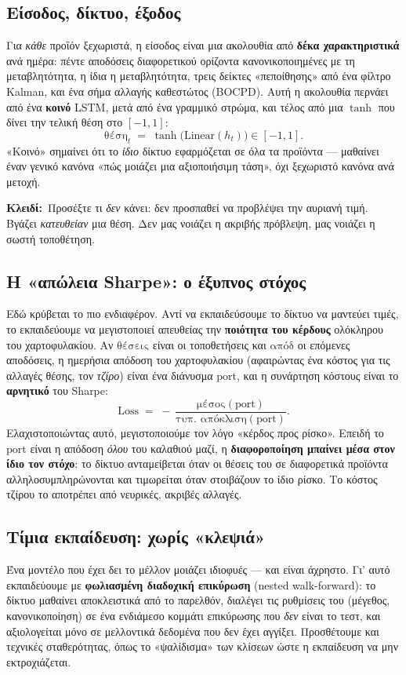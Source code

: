 \documentclass[11pt]{article}
\newcommand{\key}[1]{\par\medskip\noindent\colorbox{soft}{\parbox{\dimexpr\linewidth-2\fboxsep}{\textcolor{accent}{\textbf{Κλειδί:}}\ #1}}\par\medskip}
\begin{document}
\subsection{Είσοδος, δίκτυο, έξοδος}
Για \emph{κάθε} προϊόν ξεχωριστά, η είσοδος είναι μια ακολουθία από \textbf{δέκα χαρακτηριστικά} ανά
ημέρα: πέντε αποδόσεις διαφορετικού ορίζοντα κανονικοποιημένες με τη μεταβλητότητα, η ίδια η
μεταβλητότητα, τρεις δείκτες «πεποίθησης» από ένα φίλτρο Kalman, και ένα σήμα αλλαγής καθεστώτος
(BOCPD). Αυτή η ακολουθία περνάει από ένα \textbf{κοινό} LSTM, μετά από ένα γραμμικό στρώμα, και τέλος
από μια $\tanh$ που δίνει την τελική θέση στο $[-1,1]$:
\[
\text{θέση}_t \;=\; \tanh\big(\text{Linear}(h_t)\big)\in[-1,1].
\]
«Κοινό» σημαίνει ότι το \emph{ίδιο} δίκτυο εφαρμόζεται σε όλα τα προϊόντα --- μαθαίνει έναν γενικό
κανόνα «πώς μοιάζει μια αξιοποιήσιμη τάση», όχι ξεχωριστό κανόνα ανά μετοχή.

\key{Προσέξτε τι \emph{δεν} κάνει: δεν προσπαθεί να προβλέψει την αυριανή τιμή. Βγάζει \emph{κατευθείαν}
μια θέση. Δεν μας νοιάζει η ακριβής πρόβλεψη, μας νοιάζει η σωστή τοποθέτηση.}

\subsection{Η «απώλεια Sharpe»: ο έξυπνος στόχος}
Εδώ κρύβεται το πιο ενδιαφέρον. Αντί να εκπαιδεύσουμε το δίκτυο να μαντεύει τιμές, το εκπαιδεύουμε να
μεγιστοποιεί απευθείας την \textbf{ποιότητα του κέρδους} ολόκληρου του χαρτοφυλακίου. Αν
$\text{θέσεις}$ είναι οι τοποθετήσεις και $\text{απόδ}$ οι επόμενες αποδόσεις, η ημερήσια απόδοση του
χαρτοφυλακίου (αφαιρώντας ένα κόστος για τις αλλαγές θέσης, τον \emph{τζίρο}) είναι ένα διάνυσμα
$\text{port}$, και η συνάρτηση κόστους είναι το \textbf{αρνητικό} του Sharpe:
\[
\text{Loss} \;=\; -\,\frac{\text{μέσος}(\text{port})}{\text{τυπ.\ απόκλιση}(\text{port})}.
\]
Ελαχιστοποιώντας αυτό, μεγιστοποιούμε τον λόγο «κέρδος προς ρίσκο». Επειδή το $\text{port}$ είναι η
απόδοση \emph{όλου} του καλαθιού μαζί, η \textbf{διαφοροποίηση μπαίνει μέσα στον ίδιο τον στόχο}: το
δίκτυο ανταμείβεται όταν οι θέσεις του σε διαφορετικά προϊόντα αλληλοσυμπληρώνονται και τιμωρείται όταν
στοιβάζουν το ίδιο ρίσκο. Το κόστος τζίρου το αποτρέπει από νευρικές, ακριβές αλλαγές.

\subsection{Τίμια εκπαίδευση: χωρίς «κλεψιά»}
Ένα μοντέλο που έχει δει το μέλλον μοιάζει ιδιοφυές --- και είναι άχρηστο. Γι' αυτό εκπαιδεύουμε με
\textbf{φωλιασμένη διαδοχική επικύρωση} (nested walk-forward): το δίκτυο μαθαίνει αποκλειστικά από το
παρελθόν, διαλέγει τις ρυθμίσεις του (μέγεθος, κανονικοποίηση) σε ένα ενδιάμεσο κομμάτι επικύρωσης που
\emph{δεν} είναι το τεστ, και αξιολογείται μόνο σε μελλοντικά δεδομένα που δεν έχει αγγίξει. Προσθέτουμε
και τεχνικές σταθερότητας, όπως το «ψαλίδισμα» των κλίσεων ώστε η εκπαίδευση να μην εκτροχιάζεται.
\end{document}
